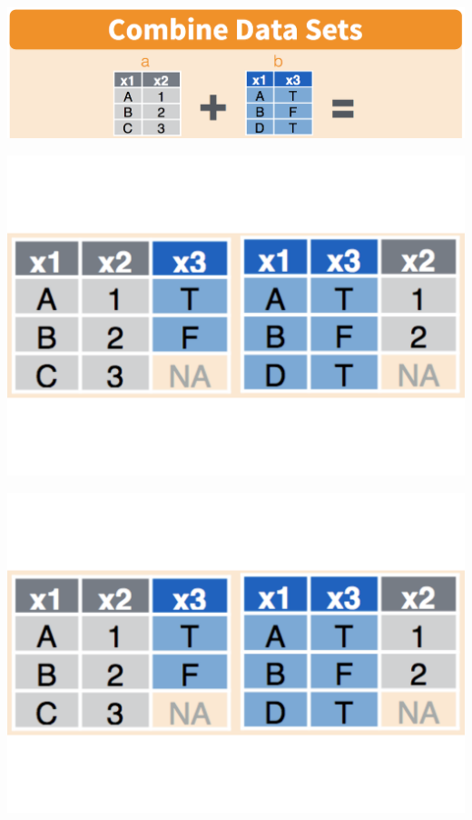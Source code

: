 \documentclass[ignorenonframetext,]{beamer}
\begin{document}
\begin{frame}{}
\protect\hypertarget{section-3}{}


\begin{center}\includegraphics[width=0.8\linewidth]{combinando_dplyr} \end{center}

\begin{center}\includegraphics[width=0.6\linewidth]{claseIntro_practico12_final_files/figure-beamer/unnamed-chunk-13-1} \end{center}

\begin{center}\includegraphics[width=0.6\linewidth]{claseIntro_practico12_final_files/figure-beamer/unnamed-chunk-14-1} \end{center}

\end{frame}
\end{document}
